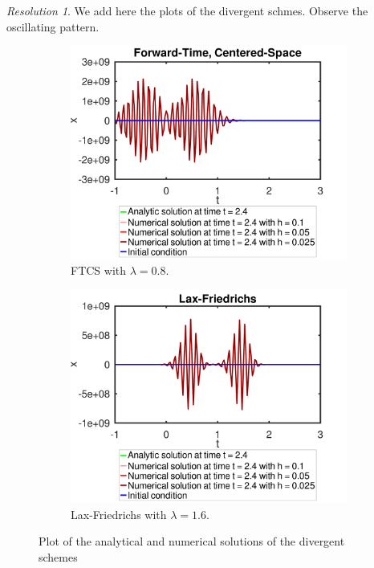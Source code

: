 \documentclass[10pt,a4paper]{article}
\theoremstyle{definition}
\theoremstyle{remark}
\newtheorem*{res}{Resolution}
\begin{document}
\begin{res}
  We add here the plots of the divergent schmes. Observe the oscillating pattern.
  \begin{figure}[ht]
    \centering
    \begin{subfigure}{0.49\textwidth}
      \centering
      \includegraphics[width=\textwidth]{Images/ftcs.pdf}
      \caption{FTCS with $\lambda=0.8$.}
    \end{subfigure}\hfill
    \begin{subfigure}{0.49\textwidth}
      \centering
      \includegraphics[width=\textwidth]{Images/lf_div.pdf}
      \caption{Lax-Friedrichs with $\lambda=1.6$.}
    \end{subfigure}
    \caption{Plot of the analytical and numerical solutions of the divergent schemes}
  \end{figure}
\end{res}
\end{document}
